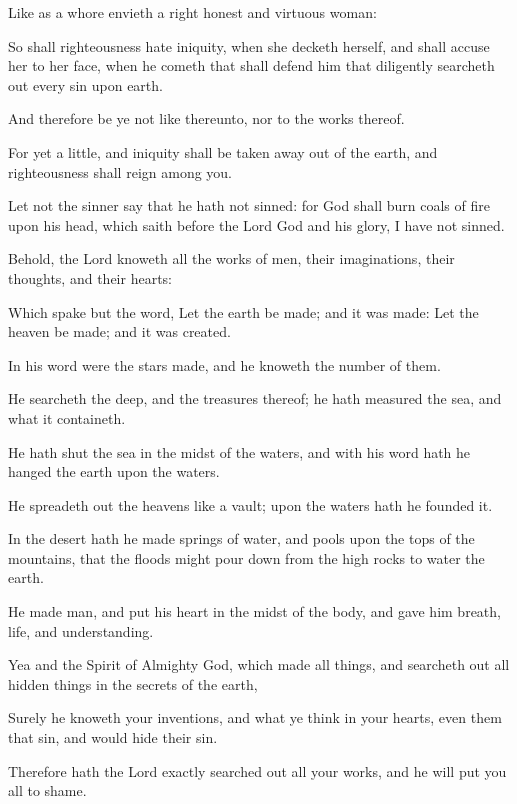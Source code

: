 {\par }{\PP {}Like as a whore envieth a right honest and virtuous woman:
\par }{\PP {}So shall righteousness hate iniquity, when she decketh herself, and shall accuse her to her face, when he cometh that shall defend him that diligently searcheth out every sin upon earth.
\par }{\PP {}And therefore be ye not like thereunto, nor to the works thereof.
\par }{\PP {}For yet a little, and iniquity shall be taken away out of the earth, and righteousness shall reign among you.
\par }{\PP {}Let not the sinner say that he hath not sinned: for God shall burn coals of fire upon his head, which saith before the Lord God and his glory, I have not sinned.
\par }{\PP {}Behold, the Lord knoweth all the works of men, their imaginations, their thoughts, and their hearts:
\par }{\PP {}Which spake but the word, Let the earth be made; and it was made: Let the heaven be made; and it was created.
\par }{\PP {}In his word were the stars made, and he knoweth the number of them.
\par }{\PP {}He searcheth the deep, and the treasures thereof; he hath measured the sea, and what it containeth.
\par }{\PP {}He hath shut the sea in the midst of the waters, and with his word hath he hanged the earth upon the waters.
\par }{\PP {}He spreadeth out the heavens like a vault; upon the waters hath he founded it.
\par }{\PP {}In the desert hath he made springs of water, and pools upon the tops of the mountains, that the floods might pour down from the high rocks to water the earth.
\par }{\PP {}He made man, and put his heart in the midst of the body, and gave him breath, life, and understanding.
\par }{\PP {}Yea and the Spirit of Almighty God, which made all things, and searcheth out all hidden things in the secrets of the earth,
\par }{\PP {}Surely he knoweth your inventions, and what ye think in your hearts, even them that sin, and would hide their sin.
\par }{\PP {}Therefore hath the Lord exactly searched out all your works, and he will put you all to shame.
}
